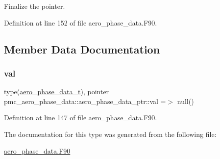 Finalize the pointer. 



Definition at line 152 of file aero\+\_\+phase\+\_\+data.\+F90.



\subsection{Member Data Documentation}
\mbox{\label{structpmc__aero__phase__data_1_1aero__phase__data__ptr_a6ab8ed4ed9263f0d5f648001a0100841}} 
\subsubsection{\texorpdfstring{val}{val}}
{\footnotesize\ttfamily type(\mbox{\hyperlink{structpmc__aero__phase__data_1_1aero__phase__data__t}{aero\+\_\+phase\+\_\+data\+\_\+t}}), pointer pmc\+\_\+aero\+\_\+phase\+\_\+data\+::aero\+\_\+phase\+\_\+data\+\_\+ptr\+::val =$>$ null()\hspace{0.3cm}{\ttfamily [private]}}



Definition at line 147 of file aero\+\_\+phase\+\_\+data.\+F90.



The documentation for this type was generated from the following file\+:\begin{DoxyCompactItemize}
\item 
\mbox{\hyperlink{aero__phase__data_8_f90}{aero\+\_\+phase\+\_\+data.\+F90}}\end{DoxyCompactItemize}
